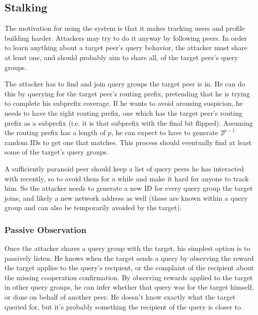\subsection{Stalking}
\label{sec:desc_stalking}
The motivation for using the system is that it makes tracking users and profile
building harder. Attackers may try to do it anyway by following peers. In order
to learn anything about a target peer's query behavior, the attacker must share
at least one, and should probably aim to share all, of the target peer's query
groups.

The attacker has to find and join query groups the target peer is in. He can do
this by querying for the target peer's routing prefix, pretending that he is
trying to complete his subprefix coverage. If he wants to avoid arousing
suspicion, he needs to have the right routing prefix, one which has the target
peer's routing prefix as a subprefix (i.e. it is that subprefix with the final
bit flipped). Assuming the routing prefix has a length of $p$, he can expect to
have to generate $2^{p-1}$ random IDs to get one that matches. This process
should eventually find at least some of the target's query groups.

A sufficiently paranoid peer should keep a list of query peers he has interacted
with recently, so to avoid them for a while and make it hard for anyone to track
him. So the attacker needs to generate a new ID for every query group the target
joins, and likely a new network address as well (these are known within a query
group and can also be temporarily avoided by the target).

\subsubsection{Passive Observation}
Once the attacker shares a query group with the target, his simplest option is
to passively listen. He knows when the target sends a query by observing the
reward the target applies to the query's recipient, or the complaint of the
recipient about the missing cooperation confirmation. By observing rewards
applied to the target in other query groups, he can infer whether that query was
for the target himself, or done on behalf of another peer. He doesn't know
exactly what the target queried for, but it's probably something the recipient
of the query is closer to.

